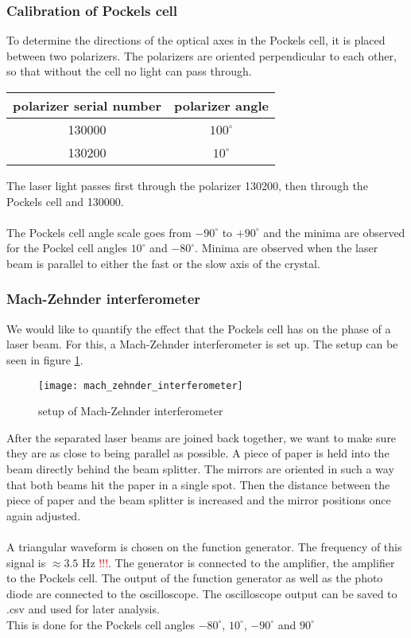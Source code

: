 \subsubsection{Calibration of Pockels cell}
To determine the directions of the optical axes in the Pockels cell,
it is placed between two polarizers. The polarizers are oriented
perpendicular to each other, so that without the cell no light can pass
through.
\begin{center}
    \begin{tabular}{c|c}
        polarizer serial number & polarizer angle \\
        \hline
        130000 & $100^\circ$ \\
        130200 & $10^\circ$
    \end{tabular}
\end{center}
The laser light passes first through the polarizer 130200, then through
the Pockels cell and 130000. \\ \\
The Pockels cell angle scale goes from $-90^\circ$ to $+90^\circ$ and
the minima are observed for the Pockel cell angles $10^\circ$ and
$-80^\circ$. Minima are observed when the laser beam is parallel to
either the fast or the slow axis of the crystal.

\subsubsection{Mach-Zehnder interferometer}
We would like to quantify the effect that the Pockels cell has on the phase
of a laser beam. For this, a Mach-Zehnder interferometer is set up.
The setup can be seen in figure \ref{mach_zehnder_interferometer}. \newpage
\begin{figure}[h!]
    \center
    \texttt{[image: mach\_zehnder\_interferometer]}
    \caption{setup of Mach-Zehnder interferometer}
    \label{mach_zehnder_interferometer}
\end{figure} \noindent
After the separated laser beams are joined back together, we want to make
sure they are as close to being parallel as possible. A piece of paper
is held into the beam directly behind the beam splitter. The mirrors
are oriented in such a way that both beams hit the paper in a single spot.
Then the distance between the piece of paper and the beam splitter is
increased and the mirror positions once again adjusted. \\ \\
A triangular waveform is chosen on the function generator. The frequency
of this signal is $\approx 3.5$ Hz \textcolor{red}{!!!}. The generator
is connected to the amplifier, the amplifier to the Pockels cell.
The output of the function generator as well as the photo diode are
connected to the oscilloscope. The oscilloscope output can be saved to
.csv and used for later analysis. \\ This is done for the Pockels cell
angles $-80^\circ$, $10^\circ$, $-90^\circ$ and $90^\circ$

